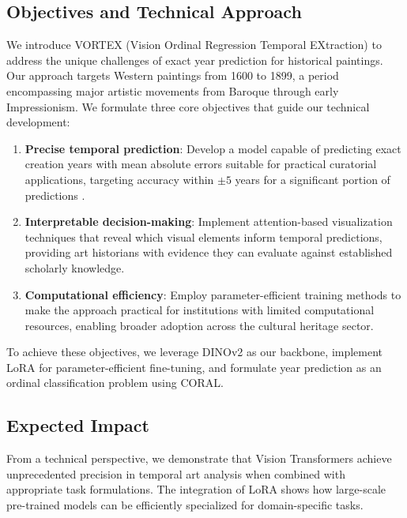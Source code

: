 \documentclass[10pt,twocolumn,letterpaper]{article}
\begin{document}
\subsection{Objectives and Technical Approach}

We introduce VORTEX (Vision Ordinal Regression Temporal EXtraction) to address the unique challenges of exact year prediction for historical paintings. Our approach targets Western paintings from 1600 to 1899, a period encompassing major artistic movements from Baroque through early Impressionism. We formulate three core objectives that guide our technical development:

\begin{enumerate}[leftmargin=1.2em,label=(\arabic*)]
   \item \textbf{Precise temporal prediction}: Develop a model capable of predicting exact creation years with mean absolute errors suitable for practical curatorial applications, targeting accuracy within $\pm5$ years for a significant portion of predictions \cite{GettyCDWA}.
   
   \item \textbf{Interpretable decision-making}: Implement attention-based visualization techniques that reveal which visual elements inform temporal predictions, providing art historians with evidence they can evaluate against established scholarly knowledge.
   
   \item \textbf{Computational efficiency}: Employ parameter-efficient training methods to make the approach practical for institutions with limited computational resources, enabling broader adoption across the cultural heritage sector.
\end{enumerate}

To achieve these objectives, we leverage DINOv2 as our backbone, implement LoRA for parameter-efficient fine-tuning, and formulate year prediction as an ordinal classification problem using CORAL.

\subsection{Expected Impact}

From a technical perspective, we demonstrate that Vision Transformers achieve unprecedented precision in temporal art analysis when combined with appropriate task formulations. The integration of LoRA shows how large-scale pre-trained models can be efficiently specialized for domain-specific tasks.
\end{document}

